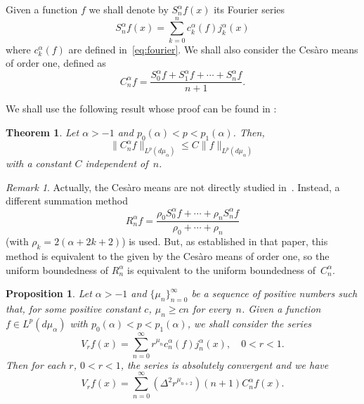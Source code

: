 \documentclass[11pt,a4paper]{amsart}
\newcommand{\mua}{d\mu_\alpha}
\newcommand{\jna}{j_n^{\alpha}}
\newcommand{\jka}{j_k^{\alpha}}
\newcommand{\cna}{c_n^{\alpha}}
\newcommand{\cka}{c_k^{\alpha}}
\newcommand{\Sna}{S_n^{\alpha}}
\newcommand{\lpnorm}[3]{\|{#1}\|_{L^{#2}({#3})}} %
\theoremstyle{plain}
\newtheorem{theor}{Theorem}
\newtheorem{propo}{Proposition}
\theoremstyle{remark}
\newtheorem*{rem}{Remark}
\begin{document}
Given a function $f$ we shall denote by $\Sna f(x)$ its Fourier series 
\[
  \Sna f(x) = \sum_{k=0}^n \cka(f)\jka(x)
\]
where $\cka(f)$ are defined in~\eqref{eq:fourier}.
We shall also consider the Ces\`aro means of order one, defined as
\begin{equation}
\label{eq:Cesaro}
  C_n^\alpha f = \frac{S_0^\alpha f + S_1^\alpha f + \cdots + S_n^\alpha f}{n+1}.
\end{equation}

We shall use the following result whose proof can be found in \cite{CiStV}:

\begin{theor}
\label{th:Cesaro}
Let $\alpha > -1$ and $p_0(\alpha) < p < p_1(\alpha)$.
Then,
\begin{equation*}
  \lpnorm{C_n^\alpha f}{p}{\mua} \le C \lpnorm{f}{p}{\mua}
\end{equation*}
with a constant $C$ independent of~$n$.
\end{theor}

\begin{rem}
Actually, the Ces\`aro means are not directly studied in~\cite{CiStV}.
Instead, a different summation method
\[
  R_n^{\alpha}f = \frac{\rho_0 S_0^{\alpha}f + \cdots
  + \rho_n \Sna f}{\rho_0 + \cdots + \rho_n}
\]
(with $\rho_k = 2(\alpha+2k+2)$) is used.
But, as established in that paper, this method is equivalent to the given by the Ces\`aro means of order one, so the uniform boundedness of $R_n^\alpha$ is equivalent to the uniform boundedness of~$C_n^\alpha$.
\end{rem}

\begin{propo}
\label{pro:Cesaro}
Let $\alpha > -1$ and $\{\mu_n\}_{n=0}^\infty$ be a sequence of positive numbers such that, for some positive constant $c$, $\mu_n \ge cn$ for every~$n$. Given a function $f \in L^p(\mua)$ with $p_0(\alpha) < p < p_1(\alpha)$,
we shall consider the series 
\[
  V_r f(x) = \sum_{n=0}^\infty r^{\mu_n} \cna(f) \jna(x),
  \quad 0 < r < 1.
\]
Then for each $r$, $0< r < 1$, the series is absolutely convergent and we have 
\[
  V_r f(x) = \sum_{n=0}^\infty (\Delta^2 r^{\mu_{n+2}}) (n+1) C_n^\alpha f(x).
\]
\end{propo}
\end{document}
